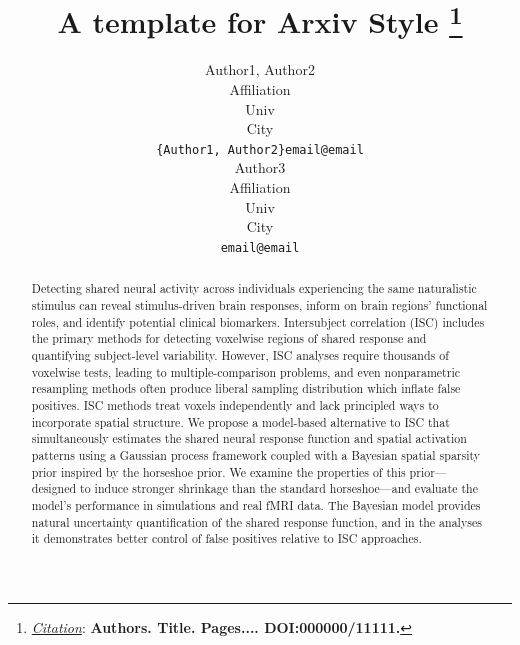 \documentclass{article}
\title{A template for Arxiv Style
\thanks{\textit{\underline{Citation}}: 
\textbf{Authors. Title. Pages.... DOI:000000/11111.}} 
}
\author{
  Author1, Author2 \\
  Affiliation \\
  Univ \\
  City\\
  \texttt{\{Author1, Author2\}email@email} \\
   \And
  Author3 \\
  Affiliation \\
  Univ \\
  City\\
  \texttt{email@email} \\
}
\begin{document}
\maketitle


\begin{abstract}
Detecting shared neural activity across individuals experiencing the same 
naturalistic stimulus can reveal stimulus-driven brain responses, inform on 
brain regions' 
functional roles, and identify potential clinical biomarkers.
Intersubject correlation (ISC) includes the primary methods
for detecting voxelwise 
regions of shared response and quantifying subject-level variability.
However, ISC analyses require thousands of voxelwise tests, leading to 
multiple-comparison problems, and even nonparametric resampling methods 
often produce liberal sampling distribution which inflate false positives.
ISC methods treat voxels independently and lack 
principled ways to incorporate spatial structure.
We propose a model-based alternative to ISC that simultaneously estimates the 
shared neural response function and spatial activation patterns using a 
Gaussian process framework coupled with a Bayesian spatial sparsity prior 
inspired by the horseshoe prior.
We examine the properties of this prior—designed to induce stronger shrinkage 
than the standard horseshoe—and evaluate the model’s performance in simulations 
and real fMRI data.
The Bayesian model provides natural uncertainty quantification of the 
shared response function, and in the analyses it demonstrates better control 
of false positives 
relative to ISC approaches.
\end{abstract}




  
  
\end{document}
